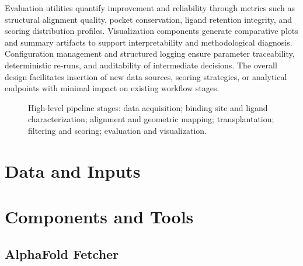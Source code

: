 Evaluation utilities quantify improvement and reliability through metrics such as structural alignment quality, pocket conservation, ligand retention integrity, and scoring distribution profiles. Visualization components generate comparative plots and summary artifacts to support interpretability and methodological diagnosis. Configuration management and structured logging ensure parameter traceability, deterministic re-runs, and auditability of intermediate decisions. The overall design facilitates insertion of new data sources, scoring strategies, or analytical endpoints with minimal impact on existing workflow stages.

\begin{figure}[H]
    \centering
    \caption{High-level pipeline stages: data acquisition; binding site and ligand characterization; alignment and geometric mapping; transplantation; filtering and scoring; evaluation and visualization.}
    \label{fig:pipeline_overview}
\end{figure}


\section{Data and Inputs}

\section{Components and Tools}
\subsection{AlphaFold Fetcher}

